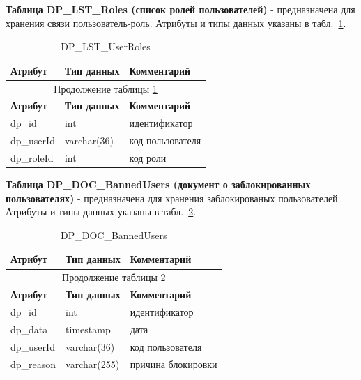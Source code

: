 \textbf{Таблица DP\_LST\_Roles (список ролей пользователей)} - предназначена для хранения связи пользователь-роль.
Атрибуты и типы данных указаны в табл.~\ref{tab:DP_LST_Roles}.

\begin{longtable}{|p{5.5cm}|p{3.5cm}|p{7.5cm}|}
    \caption{DP\_LST\_UserRoles} \label{tab:DP_LST_Roles} \\
    \hline
    \textbf{Атрибут} & \textbf{Тип данных} & \textbf{Комментарий} \\ \hline
    \endfirsthead

    \multicolumn{3}{c}{Продолжение таблицы \ref{tab:DP_LST_Roles}} \\
    \hline
    \textbf{Атрибут} & \textbf{Тип данных} & \textbf{Комментарий} \\ \hline
    \endhead

    \endfoot

    \endlastfoot
    dp\_id & int & идентификатор \\ \hline
    dp\_userId & varchar(36) & код пользователя \\ \hline
    dp\_roleId & int & код роли \\ \hline
\end{longtable}

\textbf{Таблица DP\_DOC\_BannedUsers (документ о заблокированных пользователях)} - предназначена для хранения заблокированых пользователей.
Атрибуты и типы данных указаны в табл.~\ref{tab:DP_DOC_BannedUsers}.

\begin{longtable}{|p{5.5cm}|p{3.5cm}|p{7.5cm}|}
    \caption{DP\_DOC\_BannedUsers} \label{tab:DP_DOC_BannedUsers} \\
    \hline
    \textbf{Атрибут} & \textbf{Тип данных} & \textbf{Комментарий} \\ \hline
    \endfirsthead

    \multicolumn{3}{c}{Продолжение таблицы \ref{tab:DP_DOC_BannedUsers}} \\
    \hline
    \textbf{Атрибут} & \textbf{Тип данных} & \textbf{Комментарий} \\ \hline
    \endhead

    \endfoot

    \endlastfoot
    dp\_id & int & идентификатор \\ \hline
    dp\_data & timestamp & дата \\ \hline
    dp\_userId & varchar(36) & код пользователя \\ \hline
    dp\_reason & varchar(255) & причина блокировки \\ \hline
\end{longtable}

